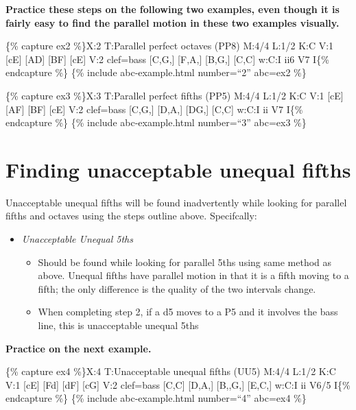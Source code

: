 \documentclass{book}
\providecommand{\tightlist}{%
  \setlength{\itemsep}{0pt}\setlength{\parskip}{0pt}}
\begin{document}
\textbf{Practice these steps on the following two examples, even though it is
fairly easy to find the parallel motion in these two examples visually.}

\{\% capture ex2 \%\}X:2 T:Parallel perfect octaves (PP8) M:4/4 L:1/2 K:C V:1
{[}cE{]} {[}AD{]}\textbar{} {[}BF{]} {[}cE{]}\textbar{]} V:2 clef=bass
{[}C,G,{]} {[}F,A,{]} \textbar{} {[}B,G,{]} {[}C,C{]}\textbar{]} w:C:I ii6 V7
I\{\% endcapture \%\} \{\% include abc-example.html number=``2'' abc=ex2 \%\}

\{\% capture ex3 \%\}X:3 T:Parallel perfect fifths (PP5) M:4/4 L:1/2 K:C V:1
{[}cE{]} {[}AF{]}\textbar{} {[}BF{]} {[}cE{]}\textbar{]} V:2 clef=bass
{[}C,G,{]} {[}D,A,{]} \textbar{} {[}DG,{]} {[}C,C{]}\textbar{]} w:C:I ii V7
I\{\% endcapture \%\} \{\% include abc-example.html number=``3'' abc=ex3 \%\}

\hypertarget{finding-unacceptable-unequal-fifths}{%
\section{Finding unacceptable unequal
fifths}\label{finding-unacceptable-unequal-fifths}}

Unacceptable unequal fifths will be found inadvertently while looking for
parallel fifths and octaves using the steps outline above. Specifcally:

\begin{itemize}
\tightlist
\item
  \emph{Unacceptable Unequal 5ths}

  \begin{itemize}
  \tightlist
  \item
    Should be found while looking for parallel 5ths using same method as
    above. Unequal fifths have parallel motion in that it is a fifth moving to
    a fifth; the only difference is the quality of the two intervals change.
  \item
    When completing step 2, if a d5 moves to a P5 and it involves the bass
    line, this is unacceptable unequal 5ths
  \end{itemize}
\end{itemize}

\textbf{Practice on the next example.}

\{\% capture ex4 \%\}X:4 T:Unacceptable unequal fifths (UU5) M:4/4 L:1/2 K:C
V:1 {[}cE{]} {[}Fd{]}\textbar{} {[}dF{]} {[}cG{]}\textbar{]} V:2 clef=bass
{[}C,C{]} {[}D,A,{]} \textbar{} {[}B,,G,{]} {[}E,C,{]}\textbar{]} w:C:I ii
V6/5 I\{\% endcapture \%\} \{\% include abc-example.html number=``4'' abc=ex4
\%\}
\end{document}
